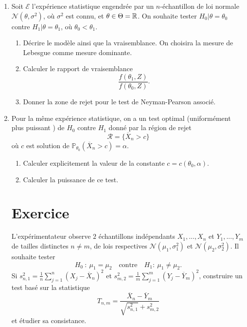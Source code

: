 \begin{enumerate}
\item Soit $\mathcal E$ l'expérience statistique engendrée par un $n$-échantillon de loi normale $\mathcal N (\theta,\sigma^2)$, où $\sigma^2$ est connu, et $\theta\in \Theta =\mathbb R$. On souhaite tester $H_0| \theta = \theta_0$ contre $H_1| \theta= \theta_1$, où $\theta_0<\theta_1$.
\begin{enumerate}
\item Décrire le modèle ainsi que la vraisemblance. On choisira la mesure de Lebesgue comme mesure dominante.
\item Calculer le rapport de vraisemblance \[\frac{f(\theta_1,Z)}{f(\theta_0,Z)}.\]
\item Donner la zone de rejet pour le test de Neyman-Pearson associé.
\end{enumerate}

\item Pour la même expérience statistique, on a un test optimal (uniformément plus puissant ) de $H_0$ contre $H_1$ donné par la région de rejet 
\[\mathcal R = \{\overline X_n >c\}\]
où $c$ est solution de $\mathbb P_{\theta_0}(\overline X_n > c)=\alpha$.
\begin{enumerate}
\item Calculer explicitement la valeur de la constante $c=c(\theta_0,\alpha)$.
\item Calculer la puissance de ce test.
\end{enumerate}

\section{Exercice}
L'expérimentateur observe $2$ échantillons indépendants $X_1,...,X_n$ et $Y_1,...,Y_m$ de tailles distinctes $n\neq m$, de lois respectives $\mathcal N(\mu_1,\sigma^2_1)$ et $\mathcal N(\mu_2,\sigma^2_2)$. Il souhaite tester
\[H_0\ : \ \mu_1=\mu_2 \quad \text{contre} \quad H_1  : \ \mu_1\neq \mu_2 .\]
Si $s_{n,1}^2 = \frac{1}{n}\sum_{j=1}^n (X_j-\overline X_n)^2$ et $s_{m,2}^2 = \frac{1}{m}\sum_{j=1}^m (Y_j-\overline Y_m)^2$, construire un test basé sur la statistique 
\[T_{n,m}=\frac{\overline X_n - \overline Y_m}{\sqrt{s_{n,1}^2}+s_{m,2}^2}\]
et étudier sa consistance.
\end{enumerate}
